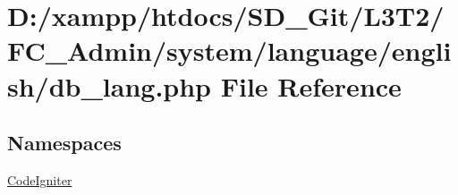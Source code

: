 \hypertarget{_admin_2system_2language_2english_2db__lang_8php}{}\section{D\+:/xampp/htdocs/\+S\+D\+\_\+\+Git/\+L3\+T2/\+F\+C\+\_\+\+Admin/system/language/english/db\+\_\+lang.php File Reference}
\label{_admin_2system_2language_2english_2db__lang_8php}
\subsection*{Namespaces}
\begin{DoxyCompactItemize}
\item 
 \hyperlink{namespace_code_igniter}{Code\+Igniter}
\end{DoxyCompactItemize}
